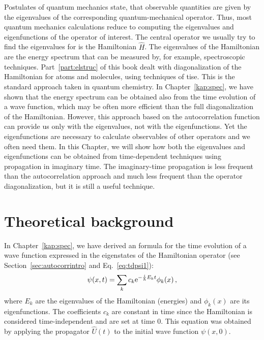 Postulates of quantum mechanics state, that observable quantities are given by the eigenvalues of the corresponding quantum-mechanical operator. Thus, most quantum mechanics calculations reduce to computing the eigenvalues and eigenfunctions of the operator of interest. The central operator we usually try to find the eigenvalues for is the Hamiltonian $\hat{H}$. The eigenvalues of the Hamiltonian are the energy spectrum that can be measured by, for example, spectroscopic techniques. Part~\ref{part:elstruc} of this book dealt with diagonalization of the Hamiltonian for atoms and molecules, using techniques of \acrfull{tise}. This is the standard approach taken in quantum chemistry. In Chapter~\ref{kap:spec}, we have shown that the energy spectrum can be obtained also from the time evolution of a wave function, which may be often more efficient than the full diagonalization of the Hamiltonian. However, this approach based on the autocorrelation function can provide us only with the eigenvalues, not with the eigenfunctions. Yet the eigenfunctions are necessary to calculate observables of other operators and we often need them. In this Chapter, we will show how both the eigenvalues and eigenfunctions can be obtained from time-dependent techniques using propagation in imaginary time. The imaginary-time propagation is less frequent than the autocorrelation approach and much less frequent than the operator diagonalization, but it is still a useful technique.

\section{Theoretical background}

In Chapter~\ref{kap:spec}, we have derived an formula for the time evolution of a wave function expressed in the eigenstates of the Hamiltonian operator (see Section~\ref{sec:autocorrintro} and Eq.~\eqref{eq:tdpsi1}):
\begin{equation}
    \psi(x,t) = \sum_k c_k \mathrm{e}^{-\frac{i}{\hbar}E_k t}\phi_k(x) \, ,
    \label{eq:tdpsi2}
\end{equation}
where $E_k$ are the eigenvalues of the Hamiltonian (energies) and $\phi_k(x)$ are its eigenfunctions. The coefficients $c_k$ are constant in time since the Hamiltonian is considered time-independent and are set at time 0. This equation was obtained by applying the propagator $\hat{U}(t)$ to the initial wave function $\psi(x,0)$. 

